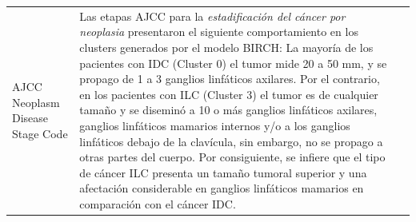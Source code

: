 \begin{table}[htb!]
\begin{threeparttable}
\begin{tabular}{p{2.5cm} p{7cm} p{6.5cm}}
			\\ \hline
			AJCC Neoplasm Disease Stage Code
			& Las etapas AJCC para la \textit{estadificación del cáncer por neoplasia} presentaron el siguiente comportamiento en los clusters generados por el modelo BIRCH: La mayoría de los pacientes con IDC (Cluster 0) el tumor mide 20 a 50 mm, y se propago de 1 a 3 ganglios linfáticos axilares. Por el contrario, en los pacientes con ILC (Cluster 3) el tumor es de cualquier tamaño y se diseminó a 10 o más ganglios linfáticos axilares, ganglios linfáticos mamarios internos y/o a los ganglios linfáticos debajo de la clavícula, sin embargo, no se propago a otras partes del cuerpo. Por consiguiente, se infiere que el tipo de cáncer ILC presenta un tamaño tumoral superior y una afectación considerable en ganglios linfáticos mamarios en comparación con el cáncer IDC.   
			

\end{tabular}
\end{threeparttable}
\end{table}
